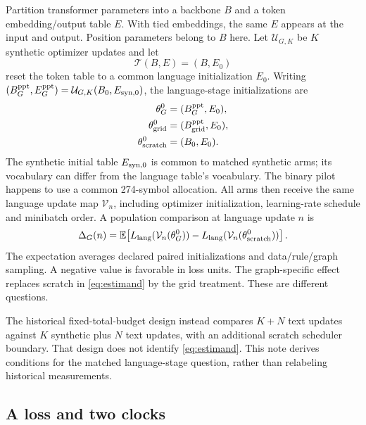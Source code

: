 Partition transformer parameters into a backbone $B$ and a token
embedding/output table $E$. With tied embeddings, the same $E$ appears at
the input and output. Position parameters belong to $B$ here.
Let $\mathcal U_{G,K}$ be $K$ synthetic optimizer updates and let
\begin{equation}
 \mathcal T(B,E)=(B,E_0)
 \label{eq:reset}
\end{equation}
reset the token table to a common language initialization $E_0$.
Writing $(B_G^{\rm ppt},E_G^{\rm ppt})
=\mathcal U_{G,K}(B_0,E_{{\rm syn},0})$, the language-stage initializations are
\begin{equation}
 \begin{aligned}
 \theta_G^0&=(B_G^{\rm ppt},E_0),\\
 \theta_{\rm grid}^0&=(B_{\rm grid}^{\rm ppt},E_0),\\
 \theta_{\rm scratch}^0&=(B_0,E_0).
 \end{aligned}
 \label{eq:initializations}
\end{equation}
The synthetic initial table $E_{{\rm syn},0}$ is common to matched synthetic
arms; its vocabulary can differ from the language table's vocabulary.
The binary pilot happens to use a common 274-symbol allocation.
All arms then receive the same language update map $\mathcal V_n$,
including optimizer initialization, learning-rate schedule and minibatch
order. A population comparison at language update $n$ is
\begin{equation}
 \Delta_G(n)=
 \mathbb{E}\!\left[
 L_{\rm lang}(\mathcal V_n(\theta_G^0))-
 L_{\rm lang}(\mathcal V_n(\theta_{\rm scratch}^0))
 \right].
 \label{eq:estimand}
\end{equation}
The expectation averages declared paired initializations and data/rule/graph
sampling. A negative value is favorable in loss units. The graph-specific
effect replaces scratch in \eqref{eq:estimand} by the grid treatment.
These are different questions.

The historical fixed-total-budget design instead compares $K+N$ text
updates against $K$ synthetic plus $N$ text updates, with an additional
scratch scheduler boundary. That design does not identify
\eqref{eq:estimand}. This note derives conditions for the matched
language-stage question, rather than relabeling historical measurements.

\subsection{A loss and two clocks}


